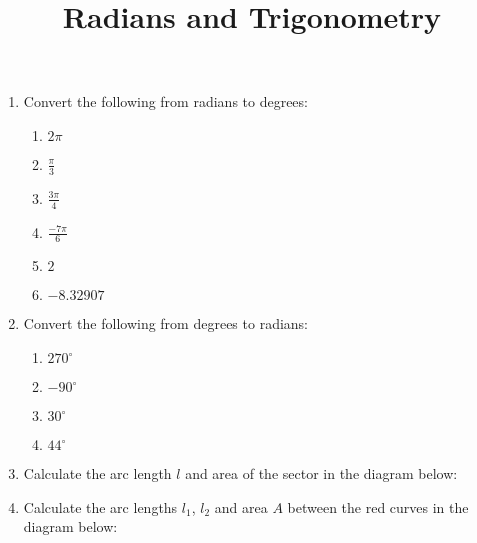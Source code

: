 \documentclass{article}
\begin{document}
\title{Radians and Trigonometry}
\date{}

\maketitle
\thispagestyle{empty}

\Large



\begin{enumerate}
\item Convert the following from radians to degrees:
	\begin{enumerate}
	\item $2\pi$
	\item $\frac{\pi}{3}$
	\item $\frac{3\pi}{4}$
	\item $\frac{-7\pi}{6}$
	\item $2$
	\item $-8.32907$
	\end{enumerate}
\item Convert the following from degrees to radians:
	\begin{enumerate}
	\item $270^\circ$
	\item $-90^\circ$
	\item $30^\circ$
	\item $44^\circ$
	\end{enumerate}
\item Calculate the arc length $l$ and area of the sector in the diagram below:
	\begin{center}
	\end{center}
\item Calculate the arc lengths $l_1$, $l_2$ and area $A$ between the red curves in the diagram below:
	\begin{center}
\end{center}
\end{enumerate}
\end{document}
